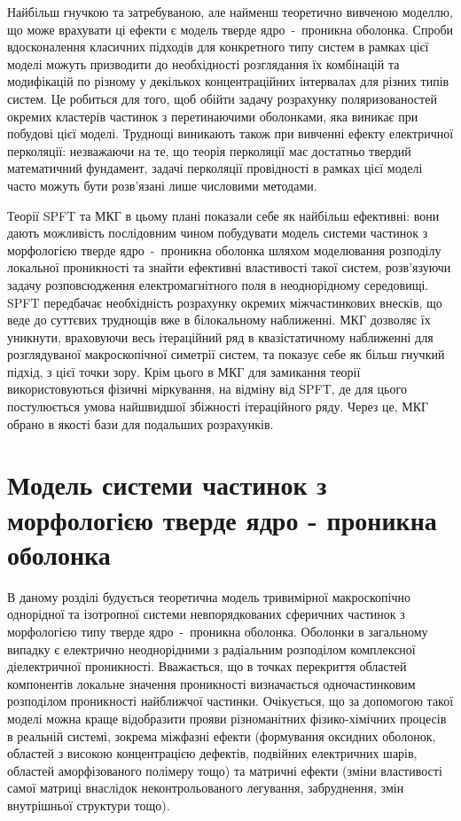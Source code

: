 \documentclass[14pt,twoside]{vakthesis}
\begin{document}
Найбільш гнучкою та затребуваною, але найменш теоретично вивченою моделлю, що може врахувати ці ефекти є модель тверде ядро~-~проникна оболонка.
Спроби вдосконалення класичних підходів для конкретного типу систем в рамках цієї моделі можуть призводити до необхідності розглядання їх комбінацій та модифікацій по різному у декількох концентраційних інтервалах для різних типів систем.
Це робиться для того, щоб обійти задачу розрахунку поляризованостей окремих кластерів частинок з перетинаючими оболонками, яка виникає при побудові цієї моделі. 
Труднощі виникають також при вивченні ефекту електричної перколяції: незважаючи на те, що теорія перколяції має достатньо твердий математичний фундамент, задачі перколяції провідності в рамках цієї моделі часто можуть бути розв'язані лише числовими методами. 

Теорії SPFT та МКГ в цьому плані показали себе як найбільш ефективні: вони дають можливість послідовним чином побудувати модель системи частинок з морфологією тверде ядро~-~проникна оболонка шляхом моделювання розподілу локальної проникності та знайти ефективні властивості такої систем, розв'язуючи задачу розповсюдження електромагнітного поля в неоднорідному середовищі.
SPFT передбачає необхідність розрахунку окремих міжчастинкових внесків, що веде до суттєвих труднощів вже в білокальному наближенні. МКГ дозволяє їх уникнути, враховуючи весь ітераційний ряд в квазістатичному наближенні для розглядуваної макроскопічної симетрії  систем, та показує себе як більш гнучкий підхід, з цієї точки зору.
Крім цього в МКГ для замикання теорії використовуються фізичні міркування, на відміну від SPFT, де для цього постулюється умова найшвидшої збіжності ітераційного ряду.
Через це, МКГ обрано в якості бази для подальших розрахунків.


\chapter{Модель системи частинок з морфологією тверде ядро - проникна оболонка}\label{sec:core-shell}

В даному розділі будується теоретична модель тривимірної макроскопічно однорідної та ізотропної системи невпорядкованих сферичних частинок з морфологією типу тверде ядро~-~проникна оболонка.
Оболонки в загальному випадку є електрично неоднорідними з радіальним розподілом комплексної діелектричної проникності. Вважається, що в точках перекриття областей компонентів локальне значення  проникності визначається одночастинковим розподілом проникності найближчої частинки.
Очікується, що за допомогою такої моделі можна краще відобразити прояви різноманітних фізико-хімічних процесів в реальній системі, зокрема міжфазні ефекти (формування оксидних оболонок, областей з високою концентрацією дефектів, подвійних електричних шарів, областей аморфізованого полімеру тощо) та матричні ефекти (зміни властивості самої матриці внаслідок неконтрольованого легування, забруднення, змін внутрішньої структури тощо).
\end{document}
